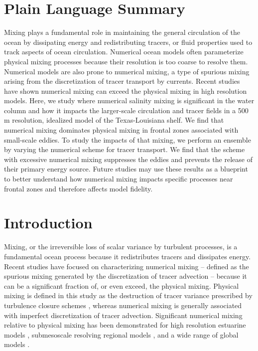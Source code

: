 \documentclass[draft]{agujournal2019}
\begin{document}
\section*{Plain Language Summary} %
Mixing plays a fundamental role in maintaining the general circulation of the ocean by dissipating energy and redistributing tracers, or fluid properties used to track aspects of ocean circulation. Numerical ocean models often parameterize physical mixing processes because their resolution is too coarse to resolve them. Numerical models are also prone to numerical mixing, a type of spurious mixing arising from the discretization of tracer transport by currents. Recent studies have shown numerical mixing can exceed the physical mixing in high resolution models. Here, we study where numerical salinity mixing is significant in the water column and how it impacts the larger-scale circulation and tracer fields in a 500 m resolution, idealized model of the Texas-Louisiana shelf. We find that numerical mixing dominates physical mixing in frontal zones associated with small-scale eddies. To study the impacts of that mixing, we perform an ensemble by varying the numerical scheme for tracer transport. We find that the scheme with excessive numerical mixing suppresses the eddies and prevents the release of their primary energy source. Future studies may use these results as a blueprint to better understand how numerical mixing impacts specific processes near frontal zones and therefore affects model fidelity. 

\section{Introduction} \label{sec:intro}
Mixing, or the irreversible loss of scalar variance by turbulent processes, is a fundamental ocean process because it redistributes tracers and dissipates energy. Recent studies have focused on characterizing numerical mixing -- defined as the spurious mixing generated by the discretization of tracer advection -- because it can be a significant fraction of, or even exceed, the physical mixing. Physical mixing is defined in this study as the destruction of tracer variance prescribed by turbulence closure schemes \cite{Burchard_2008, MacCready_2018}, whereas numerical mixing is generally associated with imperfect discretization of tracer advection. Significant numerical mixing relative to physical mixing has been demonstrated for high resolution estuarine models \cite{Ralston_2017, Rennau_2009, Wang_2021}, submesoscale resolving regional models \cite{Schlichting23}, and a wide range of global models \cite{Griffies_2000, Holmes_2021, Ilicak_2012, megann2018estimating}.
\end{document}
